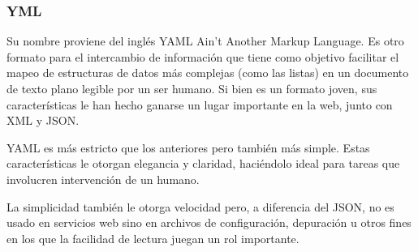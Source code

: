 \subsubsection{YML}

Su nombre proviene del inglés YAML Ain’t Another Markup Language. Es otro formato para el intercambio de información que tiene como objetivo facilitar el mapeo de estructuras de datos más complejas (como las listas) en un documento de texto plano legible por un ser humano. Si bien es un formato joven, sus características le han hecho ganarse un lugar importante en la web, junto con XML y JSON.

YAML es más estricto que los anteriores pero también más simple. Estas características le otorgan elegancia y claridad, haciéndolo ideal para tareas que involucren intervención de un humano.

La simplicidad también le otorga velocidad pero, a diferencia del JSON, no es usado en servicios web sino en archivos de configuración, depuración u otros fines en los que la facilidad de lectura juegan un rol importante.
